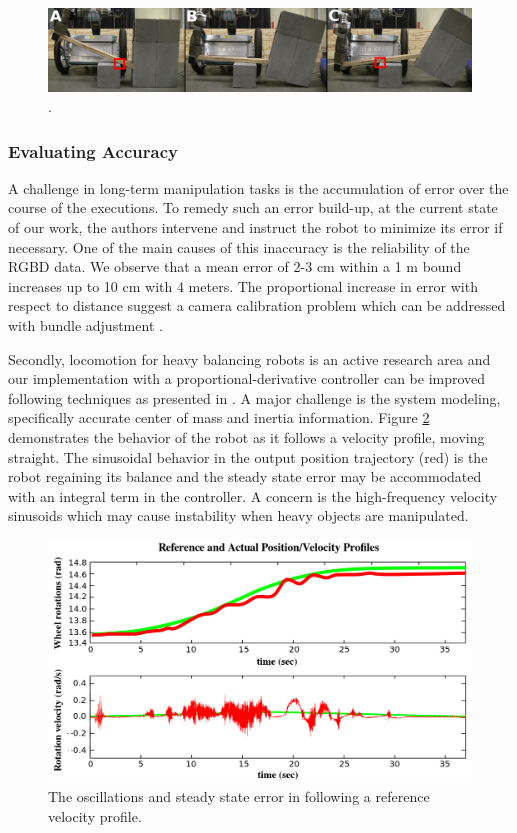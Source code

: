 \documentclass[runningheads,a4paper]{llncs}
\begin{document}
\begin{figure}[ht!] 
  \centering
  \includegraphics[width=1.0\linewidth]{Figures/short.png}
  \caption{.}
  \label{fig:short}
\end{figure}

\subsubsection{Evaluating Accuracy}

A challenge in long-term manipulation tasks is the accumulation of error over the course of the
executions. To remedy such an error build-up, at the current state of our work, the authors
intervene and instruct the robot to minimize its error if necessary. One of the main causes of this
inaccuracy is the reliability of the RGBD data. We observe that a mean error of 2-3 cm within a 1 m
bound increases up to 10 cm with 4 meters. The proportional increase in error with respect to
distance suggest a camera calibration problem which can be addressed with bundle adjustment \cite{pradeep2014calibrating}. 
 
Secondly, locomotion for heavy balancing robots is an active research area and our implementation
with a proportional-derivative controller can be improved following techniques as presented in
\cite{ha1996trajectory}. A major challenge is the system modeling, specifically accurate center of
mass and inertia information. Figure \ref{fig:controller} demonstrates the behavior of the robot as
it follows a velocity profile, moving straight. The sinusoidal behavior in the output position
trajectory (red) is the robot regaining its balance and the steady state error may be accommodated
with an integral term in the controller. A concern is the high-frequency velocity sinusoids which may cause instability when heavy objects are manipulated.

\begin{figure}[ht!] 
  \centering
  \includegraphics[width=0.9\linewidth]{Figures/controller.png}
  \caption{The oscillations and steady state error in following a reference velocity profile.}
  \label{fig:controller}
\end{figure}
\end{document}
